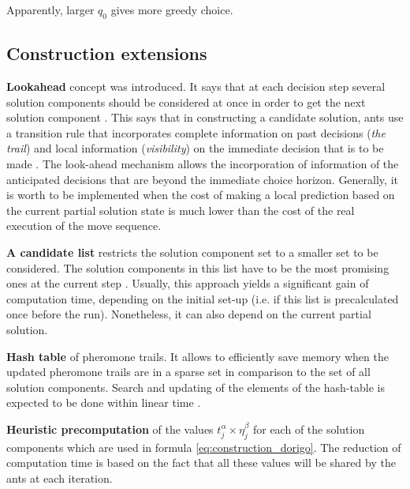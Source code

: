 \documentclass[11pt,a4paper,oneside]{book}
\begin{document}
Apparently, larger $q_0$ gives more greedy choice.

\subsection{Construction extensions}

\textbf{Lookahead} concept was introduced. It says that at each decision step several solution components should be considered at once in order to get the next solution component \cite{lookahead}. This says that in constructing a candidate solution, ants use a transition rule that incorporates complete information on past decisions (\emph{the trail}) and local information (\emph{visibility}) on the immediate decision that is to be made \cite{lookahead2}. The look-ahead mechanism allows the incorporation of information of the anticipated decisions that are beyond the immediate choice horizon. Generally, it is worth to be implemented when the cost of making a local prediction based on the current partial solution state is much lower than the cost of the real execution of the move sequence.

\textbf{A candidate list} restricts the solution component set to a smaller set to be considered. The solution components in this list have to be the most promising ones at the current step \cite{candidate_list}. Usually, this approach yields a significant gain of computation time, depending on the initial set-up (i.e. if this list is precalculated once before the run). Nonetheless, it can also depend on the current partial solution.

\textbf{Hash table} of pheromone trails. It allows to efficiently save memory when the updated pheromone trails are in a sparse set in comparison to the set of all solution components. Search and updating of the elements of the hash-table is expected to be done within linear time \cite{hash_table}.

\textbf{Heuristic precomputation} of the values $t_j^\alpha \times \eta_j^\beta$ for each of the solution components which are used in formula \eqref{eq:construction_dorigo}. The reduction of computation time is based on the fact that all these values will be shared by the ants at each iteration.
\end{document}
